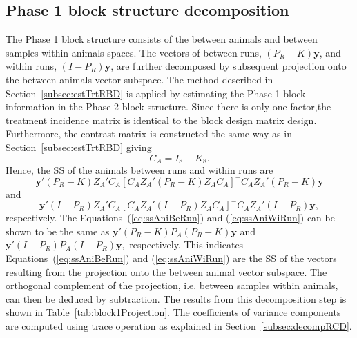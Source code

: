 \documentclass[article]{jss}
\begin{document}
\subsection{Phase 1 block structure decomposition}
The Phase 1 block structure consists of the between animals and between samples within animals spaces. The vectors of between runs, $(P_R - K)\bm{y}$, and within runs, $(I-P_R)\bm{y}$, are further decomposed by subsequent projection onto the between animals vector subspace. The method described in Section~\ref{subsec:estTrtRBD} is applied by estimating the Phase 1 block information in the Phase 2 block structure. Since there is only one factor,the treatment incidence matrix is identical to the block design matrix design. Furthermore, the contrast matrix is constructed the same way as in Section~\ref{subsec:estTrtRBD} giving
\[C_A = I_8 - K_8.\]
Hence, the SS of the animals between runs and within runs are 
\begin{equation}\label{eq:ssAniBeRun}
\bm{y}'(P_R-K)Z_{A}'C_{A}[C_{A}Z_{A}'(P_R - K)Z_{A} C_{A}]^{-} C_{A}Z_{A}'(P_R- K)\bm{y}
\end{equation}
and
\begin{equation}\label{eq:ssAniWiRun}
\bm{y}'(I-P_R)Z_{A}'C_{A}[C_{A}Z_{A}'(I-P_R)Z_{A} C_{A}]^{-} C_{A}Z_{A}'(I-P_R)\bm{y},
\end{equation}
respectively. The Equations~(\ref{eq:ssAniBeRun}) and (\ref{eq:ssAniWiRun}) can be shown to be the same as  $\bm{y}'(P_R - K)P_{A}(P_R - K)\bm{y}$ and $\bm{y}'(I-P_R)P_{A}(I-P_R)\bm{y},$
respectively. This indicates Equations~(\ref{eq:ssAniBeRun}) and (\ref{eq:ssAniWiRun}) are the SS of the vectors resulting from the projection onto the between animal vector subspace. The orthogonal complement of the projection, i.e. between samples within animals, can then be deduced by subtraction. The results from this decomposition step is shown in Table~\ref{tab:block1Projection}. The coefficients of variance components are computed using trace operation as explained in Section~\ref{subsec:decompRCD}.
\end{document}
